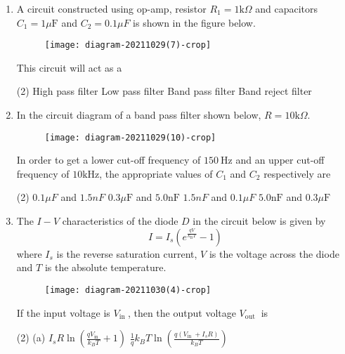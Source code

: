 \begin{enumerate}
	\item A circuit constructed using op-amp, resistor $R_{1}=1 \mathrm{k} \Omega$ and capacitors $C_{1}=1 \mu \mathrm{F}$ and $C_{2}=0.1 \mu F$ is shown in the figure below.\\
	\begin{figure}[H]
		\centering
		\texttt{[image: diagram-20211029(7)-crop]}
	\end{figure}
	This circuit will act as a
{	}
\begin{tasks}(2)
\task[\textbf{A.}] High pass filter
\task[\textbf{B.}] Low pass filter
\task[\textbf{C.}] Band pass filter
\task[\textbf{D.}] Band reject filter
\end{tasks}
	\item In the circuit diagram of a band pass filter shown below, $R=10 \mathrm{k} \Omega$.\\
	\begin{figure}[H]
		\centering
		\texttt{[image: diagram-20211029(10)-crop]}
	\end{figure}
	In order to get a lower cut-off frequency of $150 \mathrm{~Hz}$ and an upper cut-off frequency of $10 \mathrm{kHz}$, the appropriate values of $C_{1}$ and $C_{2}$ respectively are
{	}
\begin{tasks}(2)
\task[\textbf{A.}]  $0.1 \mu F$ and $1.5 n F$
\task[\textbf{B.}] $0.3 \mu \mathrm{F}$ and $5.0 \mathrm{nF}$
\task[\textbf{C.}] $1.5 n F$ and $0.1 \mu F$
\task[\textbf{D.}]  $5.0 \mathrm{nF}$ and $0.3 \mu \mathrm{F}$
\end{tasks}
	\item The $I-V$ characteristics of the diode $D$ in the circuit below is given by
	$$
	I=I_{s}\left(e^{\frac{q V}{k_{\mathrm{B}} T}}-1\right)
	$$
	where $I_{s}$ is the reverse saturation current, $V$ is the voltage across the diode and $T$ is the absolute temperature.\\
	\begin{figure}[H]
		\centering
		\texttt{[image: diagram-20211030(4)-crop]}
		\caption{}
		\label{}
	\end{figure}
	If the input voltage is $V_{\text {in }}$, then the output voltage $V_{\text {out }}$ is
{	}
\begin{tasks}(2)
\task[\textbf{A.}] (a) $I_{s} R \ln \left(\frac{q V_{\text {in }}}{k_{B} T}+1\right)$
\task[\textbf{B.}] $\frac{1}{q} k_{B} T \ln \left(\frac{q\left(V_{\text {in }}+I_{s} R\right)}{k_{B} T}\right)$

\end{tasks}
\end{enumerate}
